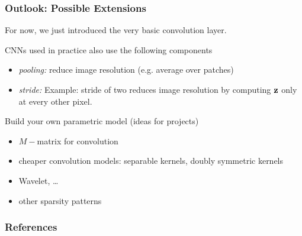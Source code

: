 \documentclass[12pt,fleqn,handout]{beamer}
\begin{document}
\begin{frame}\frametitle{Outlook: Possible Extensions}
	For now, we just introduced the very basic convolution layer. 
	
	CNNs used in practice also use the following components 
	\begin{itemize}
		\item \emph{pooling:} reduce image resolution (e.g.  average over patches)
		\item \emph{stride:} Example: stride of two reduces image resolution by computing ${\bf z}$ only at every other pixel. 
	\end{itemize}
	
	\bigskip
	
	Build your own parametric model (ideas for projects)
	\begin{itemize}
		\item $M-$matrix for convolution
		\item cheaper convolution models: separable kernels, doubly symmetric kernels
		\item Wavelet, \ldots
		\item other sparsity patterns
	\end{itemize}
	
\end{frame}

\begin{frame}[allowframebreaks]
	\frametitle{References}


\end{frame}
\end{document}
